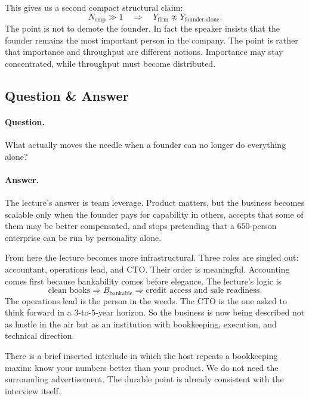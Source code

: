This gives us a second compact structural claim:
\begin{equation}
N_{\text{emp}} \gg 1 \quad \Rightarrow \quad Y_{\text{firm}} \not\approx Y_{\text{founder-alone}}.
\end{equation}
The point is not to demote the founder. In fact the speaker insists that the founder remains the most important person in the company. The point is rather that importance and throughput are different notions. Importance may stay concentrated, while throughput must become distributed.

\subsection{Question \& Answer}

\paragraph{Question.} What actually moves the needle when a founder can no longer do everything alone?

\paragraph{Answer.} The lecture’s answer is team leverage. Product matters, but the business becomes scalable only when the founder pays for capability in others, accepts that some of them may be better compensated, and stops pretending that a \(650\)-person enterprise can be run by personality alone.

From here the lecture becomes more infrastructural. Three roles are singled out: accountant, operations lead, and CTO. Their order is meaningful. Accounting comes first because bankability comes before elegance. The lecture’s logic is
\begin{equation}
\text{clean books} \Rightarrow B_{\text{bankable}} \Rightarrow \text{credit access and sale readiness}.
\end{equation}
The operations lead is the person in the weeds. The CTO is the one asked to think forward in a \(3\)-to-\(5\)-year horizon. So the business is now being described not as hustle in the air but as an institution with bookkeeping, execution, and technical direction.

There is a brief inserted interlude in which the host repeats a bookkeeping maxim: know your numbers better than your product. We do not need the surrounding advertisement. The durable point is already consistent with the interview itself.

